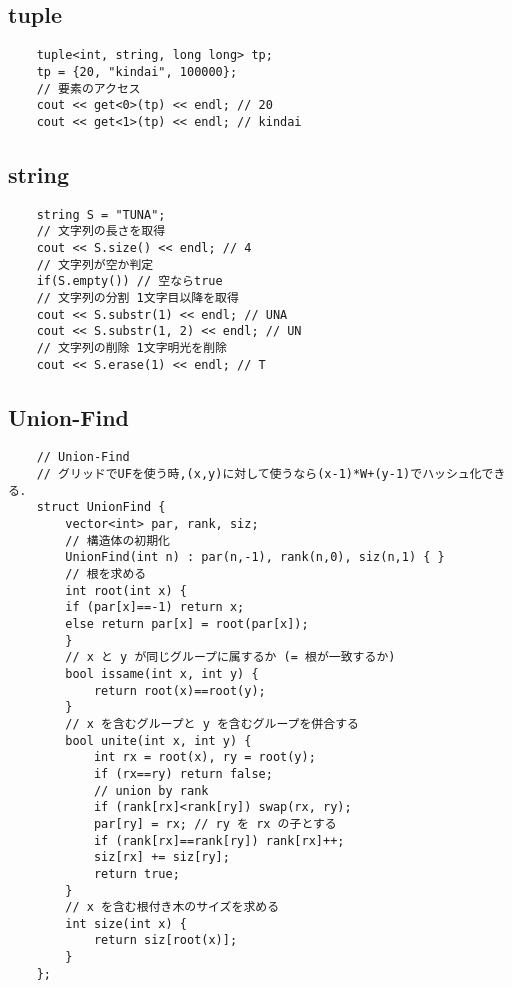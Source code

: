 \documentclass[a4paper, landscape, 9pt]{jarticle} %
\begin{document}
\begin{multicols*}{3}
    \subsection{tuple}
    \begin{lstlisting}
    tuple<int, string, long long> tp;
    tp = {20, "kindai", 100000};
    // 要素のアクセス
    cout << get<0>(tp) << endl; // 20
    cout << get<1>(tp) << endl; // kindai
    \end{lstlisting}

    \subsection{string}
    \begin{lstlisting}
    string S = "TUNA";
    // 文字列の長さを取得
    cout << S.size() << endl; // 4
    // 文字列が空か判定
    if(S.empty()) // 空ならtrue
    // 文字列の分割 1文字目以降を取得
    cout << S.substr(1) << endl; // UNA
    cout << S.substr(1, 2) << endl; // UN
    // 文字列の削除 1文字明光を削除
    cout << S.erase(1) << endl; // T

    \end{lstlisting}

    \subsection{Union-Find}
    \begin{lstlisting}
    // Union-Find
    // グリッドでUFを使う時,(x,y)に対して使うなら(x-1)*W+(y-1)でハッシュ化できる．
    struct UnionFind {
        vector<int> par, rank, siz;
        // 構造体の初期化
        UnionFind(int n) : par(n,-1), rank(n,0), siz(n,1) { }
        // 根を求める
        int root(int x) {
        if (par[x]==-1) return x;
        else return par[x] = root(par[x]);
        }
        // x と y が同じグループに属するか (= 根が一致するか)
        bool issame(int x, int y) {
            return root(x)==root(y);
        }
        // x を含むグループと y を含むグループを併合する
        bool unite(int x, int y) {
            int rx = root(x), ry = root(y);
            if (rx==ry) return false;
            // union by rank
            if (rank[rx]<rank[ry]) swap(rx, ry);
            par[ry] = rx; // ry を rx の子とする
            if (rank[rx]==rank[ry]) rank[rx]++;
            siz[rx] += siz[ry];
            return true;
        }
        // x を含む根付き木のサイズを求める
        int size(int x) {
            return siz[root(x)];
        }
    };
    

\end{lstlisting}
\end{multicols*}
\end{document}
